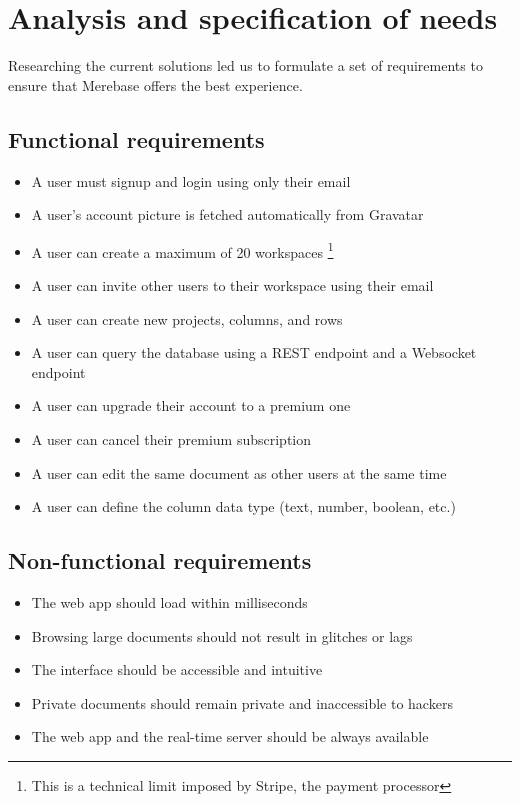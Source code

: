 \chapter{Analysis and specification of needs}

\noindent Researching the current solutions led us to formulate a set of
requirements to ensure that Merebase offers the best experience.

\section{Functional requirements}

\begin{itemize}
	\item
	      A user must signup and login using only their email
	\item
	      A user's account picture is fetched automatically from Gravatar
	\item
	      A user can create a maximum of 20 workspaces \footnote{This is a
		      technical limit imposed by Stripe, the payment processor}
	\item
	      A user can invite other users to their workspace using their email
	\item
	      A user can create new projects, columns, and rows
	\item
	      A user can query the database using a REST endpoint and a Websocket
	      endpoint
	\item
	      A user can upgrade their account to a premium one
	\item
	      A user can cancel their premium subscription
	\item
	      A user can edit the same document as other users at the same time
	\item
	      A user can define the column data type (text, number, boolean, etc.)
\end{itemize}

\section{Non-functional
  requirements}

\begin{itemize}
	\item
	      The web app should load within milliseconds
	\item
	      Browsing large documents should not result in glitches or lags
	\item
	      The interface should be accessible and intuitive
	\item
	      Private documents should remain private and inaccessible to hackers
	\item
	      The web app and the real-time server should be always available
\end{itemize}

